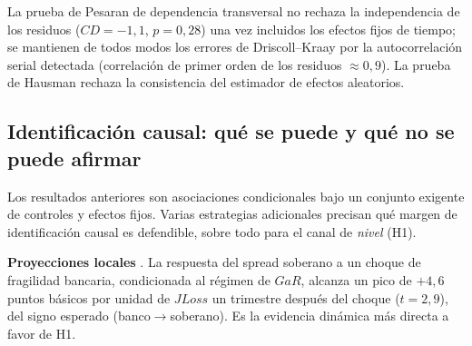La prueba de Pesaran \citep{Pesaran2021} de dependencia transversal no rechaza la independencia de los residuos ($CD=-1{,}1$, $p=0{,}28$) una vez incluidos los efectos fijos de tiempo; se mantienen de todos modos los errores de Driscoll–Kraay por la autocorrelación serial detectada (correlación de primer orden de los residuos $\approx 0{,}9$). La prueba de Hausman rechaza la consistencia del estimador de efectos aleatorios.

\subsection{Identificación causal: qué se puede y qué no se puede afirmar}\label{sec:ident-causal}

Los resultados anteriores son asociaciones condicionales bajo un conjunto exigente de controles y efectos fijos. Varias estrategias adicionales precisan qué margen de identificación causal es defendible, sobre todo para el canal de \emph{nivel} (H1).

\textbf{Proyecciones locales} \citep{Jorda2005}. La respuesta del spread soberano a un choque de fragilidad bancaria, condicionada al régimen de $GaR$, alcanza un pico de $+4{,}6$ puntos básicos por unidad de $JLoss$ un trimestre después del choque ($t=2{,}9$), del signo esperado (banco$\to$soberano). Es la evidencia dinámica más directa a favor de H1.

